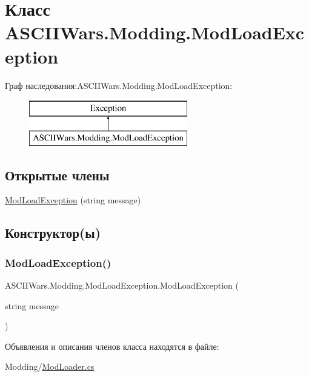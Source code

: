 \hypertarget{class_a_s_c_i_i_wars_1_1_modding_1_1_mod_load_exception}{}\section{Класс A\+S\+C\+I\+I\+Wars.\+Modding.\+Mod\+Load\+Exception}
\label{class_a_s_c_i_i_wars_1_1_modding_1_1_mod_load_exception}
Граф наследования\+:A\+S\+C\+I\+I\+Wars.\+Modding.\+Mod\+Load\+Exception\+:\begin{figure}[H]
\begin{center}
\leavevmode
\includegraphics[height=2.000000cm]{class_a_s_c_i_i_wars_1_1_modding_1_1_mod_load_exception}
\end{center}
\end{figure}
\subsection*{Открытые члены}
\begin{DoxyCompactItemize}
\item 
\hyperlink{class_a_s_c_i_i_wars_1_1_modding_1_1_mod_load_exception_a3cf0bc67df85b82a0b68322652661196}{Mod\+Load\+Exception} (string message)
\end{DoxyCompactItemize}


\subsection{Конструктор(ы)}
\hypertarget{class_a_s_c_i_i_wars_1_1_modding_1_1_mod_load_exception_a3cf0bc67df85b82a0b68322652661196}{}\label{class_a_s_c_i_i_wars_1_1_modding_1_1_mod_load_exception_a3cf0bc67df85b82a0b68322652661196} 
\subsubsection{\texorpdfstring{Mod\+Load\+Exception()}{ModLoadException()}}
{\footnotesize\ttfamily A\+S\+C\+I\+I\+Wars.\+Modding.\+Mod\+Load\+Exception.\+Mod\+Load\+Exception (\begin{DoxyParamCaption}\item[{string}]{message }\end{DoxyParamCaption})\hspace{0.3cm}{\ttfamily [inline]}}



Объявления и описания членов класса находятся в файле\+:\begin{DoxyCompactItemize}
\item 
Modding/\hyperlink{_mod_loader_8cs}{Mod\+Loader.\+cs}\end{DoxyCompactItemize}
